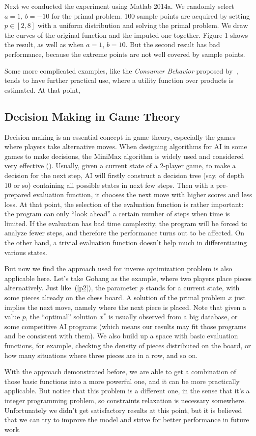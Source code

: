Next we conducted the experiment using Matlab 2014a. We randomly select $a=1$, $b=-10$ for the primal problem. 100 sample points are acquired by setting $p\in[2,8]$ with a uniform distribution and solving the primal problem. We draw the curves of the original function and the imputed one together. Figure 1 shows the result, as well as when $a=1$, $b=10$. But the second result has bad performance, because the extreme points are not well covered by sample points.

Some more complicated examples, like the \textit{Consumer Behavior} proposed by~\cite{keshavarz2011}, tends to have further practical use, where a utility function over products is estimated. At that point,

\subsection{Decision Making in Game Theory}

Decision making is an essential concept in game theory, especially the games where players take alternative moves. When designing algorithms for AI in some games to make decisions, the MiniMax algorithm is widely used and considered very effective (). Usually, given a current state of a 2-player game, to make a decision for the next step, AI will firstly construct a decision tree (say, of depth 10 or so) containing all possible states in next few steps. Then with a pre-prepared evaluation function, it chooses the next move with higher scores and less loss. At that point, the selection of the evaluation function is rather important: the program can only ``look ahead'' a certain number of steps when time is limited. If the evaluation has bad time complexity, the program will be forced to analyze fewer steps, and therefore the performance turns out to be affected. On the other hand, a trivial evaluation function doesn't help much in differentiating various states.

But now we find the approach used for inverse optimization problem is also applicable here. Let's take Gobang as the example, where two players place pieces alternatively. Just like~(\ref{p2}), the parameter $p$ stands for a current state, with some pieces already on the chess board. A solution of the primal problem $x$ just implies the next move, namely where the next piece is placed. Note that given a value $p$, the ``optimal'' solution $x^*$ is usually observed from a big database, or some competitive AI programs (which means our results may fit those programs and be consistent with them). We also build up a space with basic evaluation functions, for example, checking the density of pieces distributed on the board, or how many situations where three pieces are in a row, and so on.

With the approach demonstrated before, we are able to get a combination of those basic functions into a more powerful one, and it can be more practically applicable. But notice that this problem is a different one, in the sense that it's a integer programming problem, so constraints relaxation is necessary somewhere. Unfortunately we didn't get satisfactory results at this point, but it is believed that we can try to improve the model and strive for better performance in future work. 